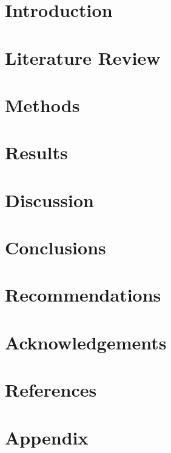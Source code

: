\documentclass{report}
\newif\iffullsubmission
\begin{document}
    \iffullsubmission
                

        \tableofcontents
        \setcounter{page}{1}

        \chapter{Abstract}
            
    \fi

    \chapter{Introduction}
        
        
    \chapter{Literature Review}
        

    \chapter{Methods}
        

    \chapter{Results}
        

    \chapter{Discussion}
        

    \chapter{Conclusions}
        

    \chapter{Recommendations}
        

    \chapter{Acknowledgements}
        

    \chapter{References}
    \printbibliography

    \appendix
    \chapter{Appendix}
    
\end{document}
